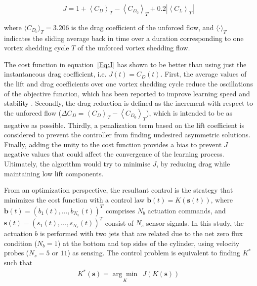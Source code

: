 \begin{equation}
    J= 1+\left\langle C_{D}\right\rangle_{T} - \left\langle C_{D_0}\right\rangle_{T}+0.2\left|\left\langle C_{L}\right\rangle_{T}\right| \label{Eq:J}
\end{equation}

where $\langle C_{D_0}\rangle_T = 3.206$ is the drag coefficient of the unforced flow, and $\langle \cdot \rangle_T$ indicates the sliding average back in time over a duration corresponding to one vortex shedding cycle $T$ of the unforced vortex shedding flow. 

The cost function in equation~\ref{Eq:J} has shown to be better than using just the instantaneous drag coefficient, i.e. $J(t) = C_D(t)$. First, the average values of the lift and drag coefficients over one vortex shedding cycle reduce the oscillations of the objective function, which has been reported to improve learning speed and stability \citep{rabault2019JFM}. Secondly, the drag reduction is defined as the increment with respect to the unforced flow ($\Delta C_D = \left\langle C_{D}\right\rangle_{T} - \left\langle C_{D_0}\right\rangle_{T}$), which is intended to be as negative as possible. Thirdly, a penalization term based on the lift coefficient is considered to prevent the controller from finding undesired asymmetric solutions\citep{rabault2019JFM}. Finally, adding the unity to the cost function provides a bias to prevent $J$ negative values that could affect the convergence of the learning process. Ultimately, the algorithm would try to minimise $J$, by reducing drag while maintaining low lift components.

From an optimization perspective, the resultant control is the strategy that minimizes the cost function with a control law $\bm{b}(t) = {K}(\bm{s}(t))$, where $\bm{b}(t) = (b_1(t), ...,b_{N_b}(t))^T$ comprises $N_b$ actuation commands, and $\bm{s}(t) = (s_1(t), ..., s_{N_s}(t))^T$ consist of $N_s$ sensor signals. In this study, the actuation $b$ is performed with two jets that are related due to the net zero flux condition ($N_b = 1$) at the bottom and top sides of the cylinder, using velocity probes ($N_s = 5$ or $11$) as sensing. The control problem is equivalent to finding ${K}^{*}$ such that
\begin{equation}\label{eq:Optproblem}
    \begin{aligned}
        {K}^{*}(\bm{s}) = \underset{{K}}{\arg\min}~~ J({K}(\bm{s}))
    \end{aligned}
\end{equation}

